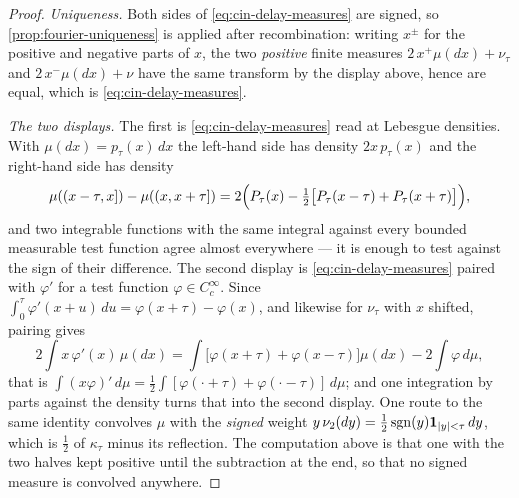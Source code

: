 \begin{proof}
\emph{Uniqueness.} Both sides of \ref{eq:cin-delay-measures} are signed, so
\ref{prop:fourier-uniqueness} is applied after recombination: writing $x^{\pm}$ for the positive
and negative parts of $x$, the two \emph{positive} finite measures
$2\,x^{+}\mu(dx) + \nu_\tau$ and $2\,x^{-}\mu(dx) + \nu$ have the same transform
by the display above, hence are equal, which is \ref{eq:cin-delay-measures}.

\emph{The two displays.} The first is \ref{eq:cin-delay-measures} read at Lebesgue densities.
With $\mu(dx) = p_\tau(x)\,dx$ the left-hand side has density $2x\,p_\tau(x)$ and the right-hand
side has density
\[
  \mu((x-\tau,x]) - \mu((x,x+\tau])
  = 2\Bigl(P_\tau(x) - \tfrac12\bigl[P_\tau(x-\tau) + P_\tau(x+\tau)\bigr]\Bigr),
\]
and two integrable functions with the same integral against every bounded measurable test
function agree almost everywhere --- it is enough to test against the sign of their difference.
The second display is \ref{eq:cin-delay-measures} paired with $\varphi'$ for a test function
$\varphi \in C_c^\infty$. Since $\int_0^\tau \varphi'(x+u)\,du = \varphi(x+\tau) - \varphi(x)$,
and likewise for $\nu_\tau$ with $x$ shifted, pairing gives
\[
  2\int x\,\varphi'(x)\,\mu(dx)
   = \int\bigl[\varphi(x+\tau) + \varphi(x-\tau)\bigr]\mu(dx) - 2\int \varphi\,d\mu ,
\]
that is $\int (x\varphi)'\,d\mu = \tfrac12\int[\varphi(\cdot+\tau) + \varphi(\cdot-\tau)]\,d\mu$;
and one integration by parts against the density turns that into the second display. One route
to the same identity convolves $\mu$ with the \emph{signed} weight
$y\,\nu_2(dy) = \tfrac12\operatorname{sgn}(y)\mathbf 1_{|y|<\tau}\,dy$, which is $\tfrac12$ of $\kappa_\tau$
minus its reflection. The computation above is that one with the two halves kept positive until
the subtraction at the end, so that no signed measure is convolved anywhere.
\end{proof}

